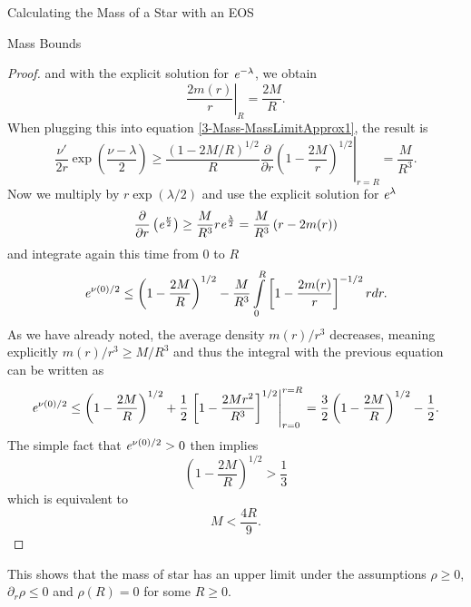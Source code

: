 \begin{section}{Calculating the Mass of a Star with an EOS}
\begin{subsection}{Mass Bounds}
\begin{proof}
	and with the explicit solution for $\mathit{e}^{-\lambda}$, we obtain
	\begin{equation}
		\left.\frac{2m(r)}{r}\right|_R = \frac{2M}{R}.
	\end{equation}
	When plugging this into equation \eqref{3-Mass-MassLimitApprox1}, the result is
	\begin{equation}
		\frac{\nu'}{2r}\exp\left(\frac{\nu-\lambda}{2}\right)\geq\frac{(1-2M/R)^{1/2}}{R}\left.\frac{\partial}{\partial r}\left(1-\frac{2M}{r}\right)^{1/2}\right|_{r=R} = \frac{M}{R^3}.
	\end{equation}
	Now we multiply by $r\exp(\lambda/2)$ and use the explicit solution for $\mathit{e}^\lambda$
	\begin{equation}
		\frac{\partial}{\partial r}\left(\mathit{e}^{\frac{\nu}{2}}\right) \geq \frac{M}{R^3}r\mathit{e}^\frac{\lambda}{2} = \frac{M}{R^3}\left(r-2m(r)\right)
	\end{equation}
	and integrate again this time from $0$ to $R$
	\begin{equation}
		\mathit{e}^{\nu(0)/2}\leq\left(1-\frac{2M}{R}\right)^{1/2}-\frac{M}{R^3}\int\limits_0^R\left[1-\frac{2m(r)}{r} \right]^{-1/2}rdr.
		\label{3-Mass-MassLimitNuApprox}
	\end{equation}
	As we have already noted, the average density $m(r)/r^3$ decreases, meaning explicitly $m(r)/r^3\geq M/R^3$ and thus the integral with the previous equation can be written as
	\begin{equation}
		\mathit{e}^{\nu(0)/2}\leq\left(1-\frac{2M}{R}\right)^{1/2}+\frac{1}{2}\left.\left[1-\frac{2Mr^2}{R^3} \right]^{1/2}\right|^{r=R}_{r=0} = \frac{3}{2}\left(1-\frac{2M}{R}\right)^{1/2} - \frac{1}{2}.
	\end{equation}
	The simple fact that $\mathit{e}^{\nu(0)/2}>0$ then implies
	\begin{equation}
		\left(1-\frac{2M}{R}\right)^{1/2} > \frac{1}{3}
	\end{equation}
	which is equivalent to
	\begin{equation}
		M< \frac{4R}{9}.
	\end{equation}
\end{proof}\noindent
This shows that the mass of star has an upper limit under the assumptions $\rho\geq0$, $\partial_r\rho\leq0$ and $\rho(R)=0$ for some $R\geq0$. 
\end{subsection}
%
%
\end{section}
 

